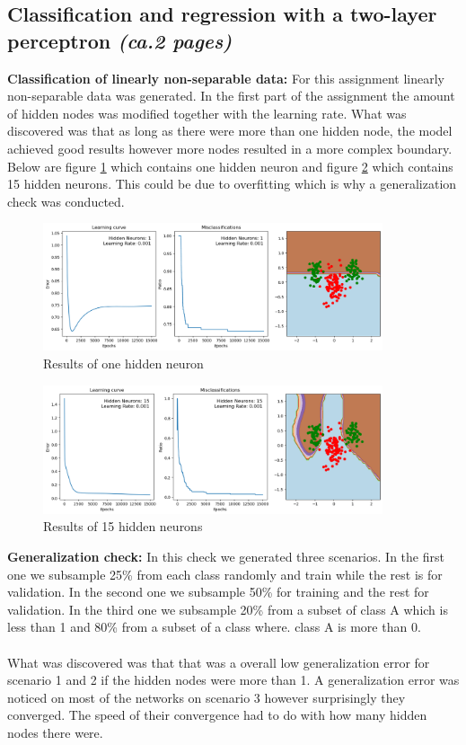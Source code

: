 \documentclass[a4paper]{article}
\begin{document}
\subsection{Classification and regression with a two-layer perceptron \textit{(ca.2 pages)}}
\textbf{Classification of linearly non-separable data:} For this assignment linearly non-separable data was generated. In the first part of the assignment the amount of hidden nodes was modified together with the learning rate. What was discovered was that as long as there were more than one hidden node, the model achieved good results however more nodes resulted in a more complex boundary. Below are figure \ref{fig:1Hidden} which contains one hidden neuron and figure \ref{fig:15Hidden} which contains 15 hidden neurons. This could be due to overfitting which is why a generalization check was conducted.

\begin{figure}[htb]
    \centering
    \includegraphics[width=10cm]{Labs/Lab 1/Lab 1b/Figure/1Hiddenlayer.png}
    \caption{Results of one hidden neuron}
    \label{fig:1Hidden}
\end{figure}

\begin{figure}[htb]
    \centering
    \includegraphics[width=10cm]{Labs/Lab 1/Lab 1b/Figure/15HiddenLayer.png}
    \caption{Results of 15 hidden neurons}
    \label{fig:15Hidden}
\end{figure}
\textbf{Generalization check:}
In this check we generated three scenarios. In the first one we subsample 25\% from each class randomly and train while the rest is for validation. In the second one we subsample 50\% for training and the rest for validation. In the third one we subsample 20\% from a subset of class A which is less than 1 and 80\% from a subset of a class where. class A is more than 0. \\
\\ What was discovered was that that was a overall low generalization error for scenario 1 and 2 if the hidden nodes were more than 1. A generalization error was noticed on most of the networks on scenario 3 however surprisingly they converged. The speed of their convergence had to do with how many hidden nodes there were. 
\end{document}
